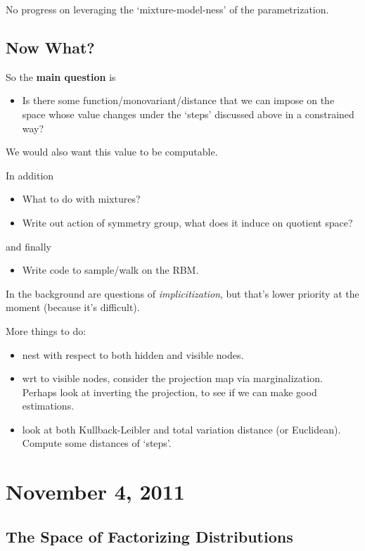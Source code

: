 \documentclass[11pt]{article}
\begin{document}
No progress on leveraging the `mixture-model-ness' of the parametrization.

\subsection{Now What?}

So the \textbf{main question} is
\begin{itemize}
    \item Is there some function/monovariant/distance that we can impose on the
    space whose value changes under the `steps' discussed above in a constrained
    way?
\end{itemize}
We would also want this value to be computable.

In addition
\begin{itemize}
    \item What to do with mixtures?
    \item Write out action of symmetry group, what does it induce on quotient
    space?
\end{itemize}
and finally
\begin{itemize}
    \item Write code to sample/walk on the RBM.
\end{itemize}
In the background are questions of \textit{implicitization}, but that's lower
priority at the moment (because it's difficult).

More things to do:
\begin{itemize}
    \item nest with respect to both hidden and visible nodes.
    \item wrt to visible nodes, consider the projection map via marginalization.
          Perhaps look at inverting the projection, to see if we can make good
          estimations.
    \item look at both Kullback-Leibler and total variation distance (or
          Euclidean).  Compute some distances of `steps'.
\end{itemize}

\section{November 4, 2011}

\subsection{The Space of Factorizing Distributions}
\end{document}
